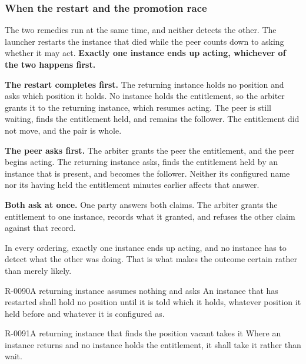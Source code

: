 \subsubsection{When the restart and the promotion race}
\label{sec:ha:enabled:process_death:race}

The two remedies run at the same time, and neither detects the other. The
launcher restarts the instance that died while the peer counts down to asking
whether it may act. \textbf{Exactly one instance ends up acting, whichever of the
two happens first.}

\textbf{The restart completes first.} The returning instance holds no position
and asks which position it holds. No instance holds the entitlement, so the
arbiter grants it to the returning instance, which resumes acting. The peer is
still waiting, finds the entitlement held, and remains the follower. The
entitlement did not move, and the pair is whole.

\textbf{The peer asks first.} The arbiter grants the peer the entitlement, and
the peer begins acting. The returning instance asks, finds the entitlement held
by an instance that is present, and becomes the follower. Neither its configured
name nor its having held the entitlement minutes earlier affects that answer.

\textbf{Both ask at once.} One party answers both claims. The arbiter grants the
entitlement to one instance, records what it granted, and refuses the other claim
against that record.

In every ordering, exactly one instance ends up acting, and no instance has to
detect what the other was doing. That is what makes the outcome certain rather
than merely likely.

\begin{requirement}{R-0090}{A returning instance assumes nothing and asks}
  An instance that has restarted shall hold no position until it is told which
  it holds, whatever position it held before and whatever it is configured as.
\end{requirement}

\begin{requirement}{R-0091}{A returning instance that finds the position vacant takes it}
  Where an instance returns and no instance holds the entitlement, it shall take
  it rather than wait.
\end{requirement}

